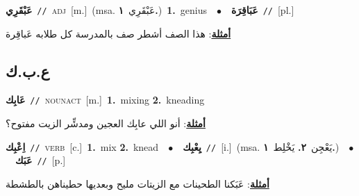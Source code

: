 \documentclass[10pt,a4paper,twoside]{article} %
\begin{document}
\begin{multicols}{2}
{{{{{{{{{\setlength\topsep{0pt}\textbf{\foreignlanguage{arabic}{عَبْقَرِي}}\ {\color{gray}\texttt{//}\color{black}}\ \textsc{adj}\ [m.]\ \color{gray}(msa. \foreignlanguage{arabic}{عَبْقَرِي}~\foreignlanguage{arabic}{\textbf{١.}})\color{black}\ \textbf{1.}~genius\ \ $\bullet$\ \ \setlength\topsep{0pt}\textbf{\foreignlanguage{arabic}{عَبَاقِرَة}}\ {\color{gray}\texttt{//}\color{black}}\ [pl.]\  \begin{flushright}\color{gray}\foreignlanguage{arabic}{\textbf{\underline{\foreignlanguage{arabic}{أمثلة}}}: هذا الصف أشطر صف بالمدرسة كل طلابه عَباقِرة}\end{flushright}\color{black}} \vspace{2mm}

\vspace{-3mm}
\subsection*{\color{blue}\foreignlanguage{arabic}{ع.ب.ك}\color{blue}{}} 

{\setlength\topsep{0pt}\textbf{\foreignlanguage{arabic}{عَابِك}}\ {\color{gray}\texttt{//}\color{black}}\ \textsc{noun\textunderscore act}\ [m.]\ \textbf{1.}~mixing  \textbf{2.}~kneading\  \begin{flushright}\color{gray}\foreignlanguage{arabic}{\textbf{\underline{\foreignlanguage{arabic}{أمثلة}}}: أنو اللي عابِك العجين ومدشِّر الزيت مفتوح؟}\end{flushright}\color{black}} \vspace{2mm}

{\setlength\topsep{0pt}\textbf{\foreignlanguage{arabic}{اِعْبِك}}\ {\color{gray}\texttt{//}\color{black}}\ \textsc{verb}\ [c.]\ \textbf{1.}~mix  \textbf{2.}~knead\ \ $\bullet$\ \ \setlength\topsep{0pt}\textbf{\foreignlanguage{arabic}{يِعْبِك}}\ {\color{gray}\texttt{//}\color{black}}\ [i.]\ \color{gray}(msa. \foreignlanguage{arabic}{يَعْجِن}~\foreignlanguage{arabic}{\textbf{٢.}}  \foreignlanguage{arabic}{يَخْلِط}~\foreignlanguage{arabic}{\textbf{١.}})\color{black}\ \ $\bullet$\ \ \setlength\topsep{0pt}\textbf{\foreignlanguage{arabic}{عَبَك}}\ {\color{gray}\texttt{//}\color{black}}\ [p.]\  \begin{flushright}\color{gray}\foreignlanguage{arabic}{\textbf{\underline{\foreignlanguage{arabic}{أمثلة}}}: عَبَكنا الطحينات مع الزيتات مليح وبعديها حطيناهن بالطشطة}\end{flushright}\color{black}} \vspace{2mm}

}}}}}}}}
\end{multicols}
\end{document}
